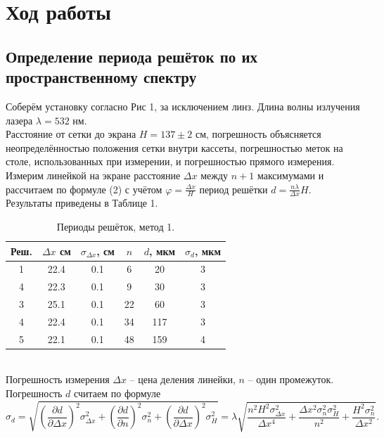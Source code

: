 \documentclass[a4paper,12pt]{article}
\begin{document}
\section{Ход работы}
\subsection{ Определение периода решёток по их пространственному спектру}
Соберём установку согласно Рис 1, за исключением линз. Длина волны излучения лазера $\lambda = 532 \text{ нм}$.\\
Расстояние от сетки до экрана $H = 137 \pm 2 \text{ см}$, погрешность объясняется неопределённостью положения сетки внутри кассеты, погрешностью меток на столе, использованных при измерении, и погрешностью прямого измерения.\\
Измерим линейкой на экране расстояние $\Delta x$ между $n+1$ максимумами и рассчитаем по формуле (2) с учётом $\varphi = \frac{\Delta x}{H}$ период решётки $d = \frac{n \lambda}{\Delta x}H$. Результаты приведены в Таблице 1.
\begin{table}[h]
\begin{tabular}{|c|c|c|c|c|c|}
\hline
Реш. & $\Delta x$ см & $\sigma_{\Delta x}$, см & $n$  & $d$, мкм & $\sigma_d$, мкм \\ \hline
1     & 22.4         & 0.1                   & 6  & 20 & 3        \\ \hline
4     & 22.3         & 0.1                   & 9  & 30 & 3        \\ \hline
3     & 25.1         & 0.1                   & 22 & 60 & 3        \\ \hline
4     & 22.4         & 0.1                   & 34 & 117 & 3 	\\ \hline
5     & 22.1         & 0.1                   & 48 & 159 & 4        \\ \hline
\end{tabular}
\centering
\caption{Периоды решёток, метод 1.}
\end{table}\\


Погрешность измерения $\Delta x$ -- цена деления линейки, $n$ -- один промежуток. Погрешность $d$ считаем по формуле
$$
\sigma_{d} = \sqrt{\left(\dfrac{\partial d}{\partial \Delta x}\right)^2 \sigma^2_{\Delta x} + \left(\dfrac{\partial d}{\partial n}\right)^2 \sigma^2_{n} + \left(\dfrac{\partial d}{\partial \Delta x}\right)^2 \sigma^2_{H}} =\lambda \sqrt{\dfrac{n^2 H^2 \sigma^2_{\Delta x}}{\Delta x^4} + \dfrac{\Delta x^2 \sigma^2_{n} \sigma^2_{H}}{n^2} + \dfrac{H^2 \sigma^2_{n}}{\Delta x^2}}.
$$
\end{document}
